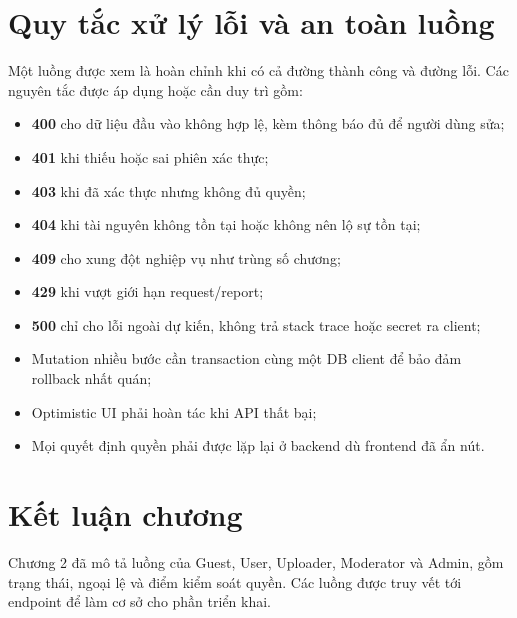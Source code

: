 \section{Quy tắc xử lý lỗi và an toàn luồng}

Một luồng được xem là hoàn chỉnh khi có cả đường thành công và đường lỗi. Các nguyên tắc được áp dụng hoặc cần duy trì gồm:

\begin{itemize}[leftmargin=4.5em, label=--, labelsep=0.6em]
  \item \textbf{400} cho dữ liệu đầu vào không hợp lệ, kèm thông báo đủ để người dùng sửa;
  \item \textbf{401} khi thiếu hoặc sai phiên xác thực;
  \item \textbf{403} khi đã xác thực nhưng không đủ quyền;
  \item \textbf{404} khi tài nguyên không tồn tại hoặc không nên lộ sự tồn tại;
  \item \textbf{409} cho xung đột nghiệp vụ như trùng số chương;
  \item \textbf{429} khi vượt giới hạn request/report;
  \item \textbf{500} chỉ cho lỗi ngoài dự kiến, không trả stack trace hoặc secret ra client;
  \item Mutation nhiều bước cần transaction cùng một DB client để bảo đảm rollback nhất quán;
  \item Optimistic UI phải hoàn tác khi API thất bại;
  \item Mọi quyết định quyền phải được lặp lại ở backend dù frontend đã ẩn nút.
\end{itemize}

\section{Kết luận chương}

Chương 2 đã mô tả luồng của Guest, User, Uploader, Moderator và Admin, gồm trạng thái, ngoại lệ và điểm kiểm soát quyền. Các luồng được truy vết tới endpoint để làm cơ sở cho phần triển khai.
